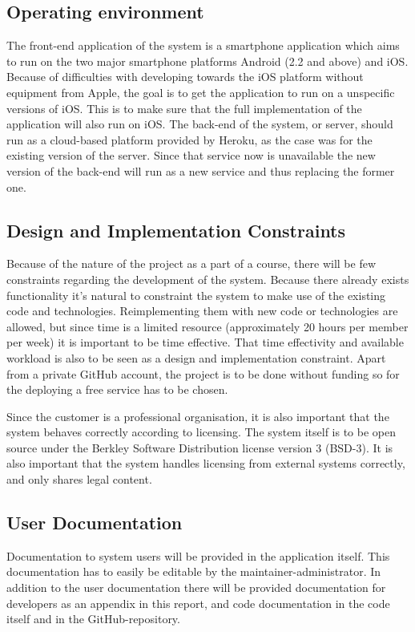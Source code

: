 \subsection{Operating environment}
The front-end application of the system is a smartphone application which aims to run on the two major smartphone platforms Android (2.2 and above) and iOS. Because of difficulties with developing towards the iOS platform without equipment from Apple, the goal is to get the application to run on a unspecific versions of iOS. This is to make sure that the full implementation of the application will also run on iOS. The back-end of the system, or server, should run as a cloud-based platform provided by Heroku, as the case was for the existing version of the server. Since that service now is unavailable the new version of the back-end will run as a new service and thus replacing the former one. 

\subsection{Design and Implementation Constraints}
Because of the nature of the project as a part of a course, there will be few constraints regarding the development of the system. Because there already exists functionality it's natural to constraint the system to make use of the existing code and technologies. Reimplementing them with new code or technologies are allowed, but since time is a limited resource (approximately 20 hours per member per week) it is important to be time effective. That time effectivity and available workload is also to be seen as a design and implementation constraint. Apart from a private GitHub account, the project is to be done without funding so for the deploying a free service has to be chosen.

\noindent

Since the customer is a professional organisation, it is also important that the system behaves correctly according to licensing. The system itself is to be open source under the Berkley Software Distribution license version 3 (BSD-3). It is also important that the system handles licensing from external systems correctly, and only shares legal content.

\subsection{User Documentation}

Documentation to system users will be provided in the application itself. This documentation has to easily be editable by the maintainer-administrator. In addition to the user documentation there will be provided documentation for developers as an appendix in this report, and code documentation in the code itself and in the GitHub-repository. 

